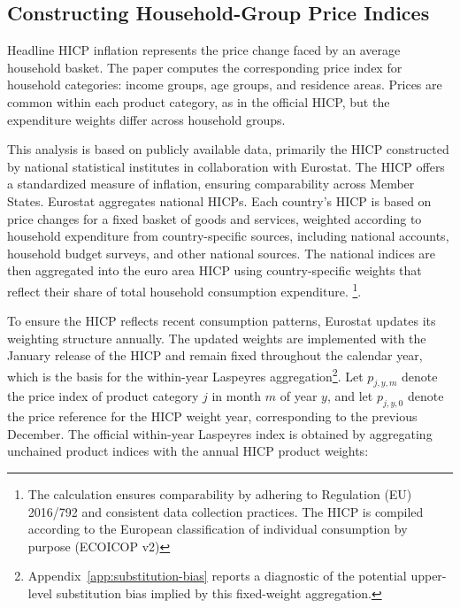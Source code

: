 \documentclass[11pt]{article}
\begin{document}
\subsection{Constructing Household-Group Price Indices}



Headline HICP inflation represents the price change faced by an average household basket. The paper 
computes the corresponding price index for household categories: income groups,
age groups, and residence areas. Prices are common within each product category, as in the official
HICP, but the expenditure weights differ across household groups.


This analysis is based on publicly available data, primarily the HICP constructed by national statistical
 institutes in collaboration with Eurostat. The HICP
offers a standardized measure of inflation, ensuring comparability across Member States. Eurostat
aggregates national HICPs. Each country's HICP is based on price changes for a fixed basket of goods
and services, weighted according to household expenditure from country-specific sources, including
national accounts, household budget surveys, and other national sources. The national indices are
then aggregated into the euro area HICP using country-specific weights that reflect their share of
total household consumption expenditure. \footnote{The calculation ensures comparability by adhering to
Regulation (EU) 2016/792 and consistent data collection practices. The HICP is compiled according to
the European classification of individual consumption by purpose (ECOICOP v2)}.

To ensure the HICP reflects recent consumption patterns, Eurostat updates its weighting structure
annually. The updated weights are implemented with the January release of the HICP and remain fixed
throughout the calendar year, which is the basis for the within-year Laspeyres
aggregation\footnote{Appendix~\ref{app:substitution-bias} reports a diagnostic of the potential
upper-level substitution bias implied by this fixed-weight aggregation.}. Let $p_{j,y,m}$ denote the
price index of product category $j$ in month $m$ of year $y$, and let $p_{j,y,0}$ denote the price
reference for the HICP weight year, corresponding to the previous December. The official within-year
Laspeyres index is obtained by aggregating unchained product indices with the annual HICP product
weights:
\end{document}
